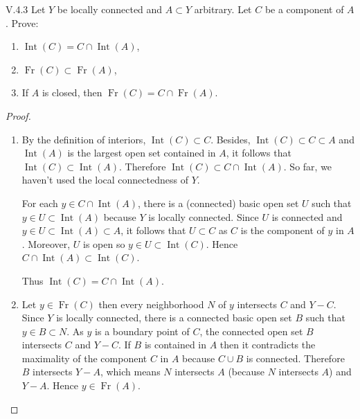 \begin{problem}{V.4.3}
Let \( Y \) be locally connected and \( A \subset Y \) arbitrary. Let \( C \) be a component of \( A \). Prove:
\begin{enumerate}[label={(\alph*)}]
	\item \(\operatorname{Int}(C) = C \cap \operatorname{Int}(A)\),
	\item \(\operatorname{Fr}(C) \subset \operatorname{Fr}(A)\),
	\item If \( A \) is closed, then \(\operatorname{Fr}(C) = C \cap \operatorname{Fr}(A)\).
\end{enumerate}
\end{problem}

\begin{proof}
	\begin{enumerate}[label={(\alph*)}]
		\item By the definition of interiors, \( \operatorname{Int}(C) \subset C \). Besides, \( \operatorname{Int}(C) \subset C \subset A \) and \( \operatorname{Int}(A) \) is the largest open set contained in \( A \), it follows that \( \operatorname{Int}(C) \subset \operatorname{Int}(A) \). Therefore \( \operatorname{Int}(C) \subset C \cap \operatorname{Int}(A) \). So far, we haven't used the local connectedness of \( Y \).

		      For each \( y \in C \cap \operatorname{Int}(A) \), there is a (connected) basic open set \( U \) such that \( y \in U \subset \operatorname{Int}(A) \) because \( Y \) is locally connected. Since \( U \) is connected and \( y \in U \subset \operatorname{Int}(A) \subset A \), it follows that \( U \subset C \) as \( C \) is the component of \( y \) in \( A \). Moreover, \( U \) is open so \( y \in U \subset \operatorname{Int}(C) \). Hence \( C \cap \operatorname{Int}(A) \subset \operatorname{Int}(C) \).

		      Thus \( \operatorname{Int}(C) = C \cap \operatorname{Int}(A) \).
		\item Let \( y \in \operatorname{Fr}(C) \) then every neighborhood \( N \) of \( y \) intersects \( C \) and \( Y - C \). Since \( Y \) is locally connected, there is a connected basic open set \( B \) such that \( y \in B \subset N \). As \( y \) is a boundary point of \( C \), the connected open set \( B \) intersects \( C \) and \( Y - C \). If \( B \) is contained in \( A \) then it contradicts the maximality of the component \( C \) in \( A \) because \( C \cup B \) is connected. Therefore \( B \) intersects \( Y - A \), which means \( N \) intersects \( A \) (because \(N\) intersects \(A\)) and \( Y - A \). Hence \( y \in \operatorname{Fr}(A) \).


\end{enumerate}
\end{proof}
